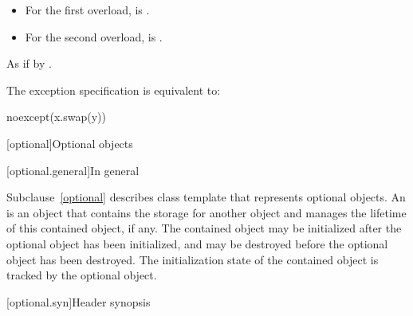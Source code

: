 \begin{itemdescr}
\pnum
\constraints
\begin{itemize}
\item
For the first overload,
 is .
\item
For the second overload,
 is .
\end{itemize}

\pnum
\effects
As if by .

\pnum
\remarks
The exception specification is equivalent to:

\begin{codeblock}
noexcept(x.swap(y))
\end{codeblock}
\end{itemdescr}

[optional]{Optional objects}

[optional.general]{In general}

\pnum
Subclause~\ref{optional} describes class template  that represents
optional objects.
An  is an
object that contains the storage for another object and manages the lifetime of
this contained object, if any. The contained object may be initialized after
the optional object has been initialized, and may be destroyed before the
optional object has been destroyed. The initialization state of the contained
object is tracked by the optional object.

[optional.syn]{Header  synopsis}

